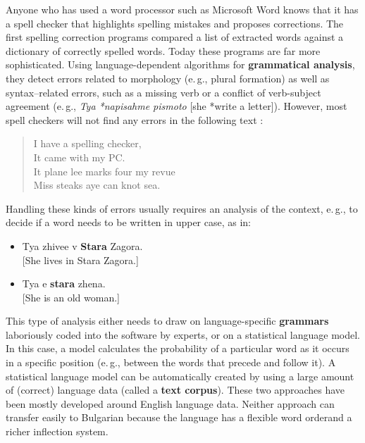 \begin{multicols}{2}
  Anyone who has used a word processor such as Microsoft Word knows that it has a spell checker that highlights spelling mistakes and proposes corrections. The first spelling correction programs compared a list of extracted words against a dictionary of correctly spelled words. Today these programs are far more sophisticated. Using language-dependent algorithms for \textbf{grammatical analysis}, they detect errors related to morphology (e.\,g., plural formation) as well as syntax–related errors, such as a missing verb or a conflict of verb-subject agreement  (e.\,g., \textit{Tya *napisahme pismoto} [she *write a letter]). However, most spell checkers will not find any errors in the following text \cite{zar1}:

  \begin{quote}
    I have a spelling checker,\\
    It came with my PC.\\
    It plane lee marks four my revue\\
    Miss steaks aye can knot sea.
  \end{quote}

  Handling these kinds of errors usually requires an analysis of the context, e.\,g., to decide if a word needs to be written in upper case, as in:

  \begin{itemize}
  \item Tya zhivee v \textbf{Stara} Zagora.\\ {[}She lives in Stara Zagora.{]} 
  \item Tya e \textbf{stara} zhena.\\ {[}She is an old woman.{]}
  \end{itemize}

  This type of analysis either needs to draw on language-specific \textbf{grammars} laboriously coded into the software by experts, or on a statistical language model. In this case, a model calculates the probability of a particular word as it occurs in a specific position (e.\,g., between the words that precede and follow it). A statistical language model can be automatically created by using a large amount of (correct) language data (called a \textbf{text corpus}). These two approaches have been mostly developed around English language data. Neither approach can transfer easily to Bulgarian because the language has a flexible word orderand a richer inflection system. 


\end{multicols}
